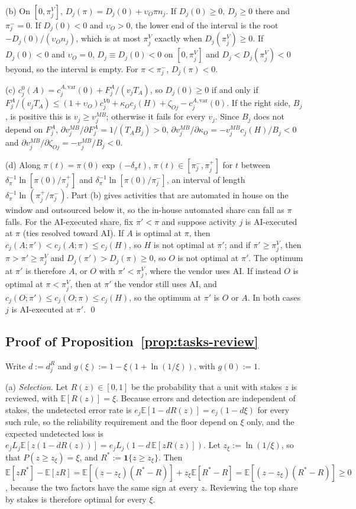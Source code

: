 (b) On $[0,\pi^V_j]$, $D_j(\pi)=D_j(0)+\upsilon_O\pi n_j$. If $D_j(0)\ge 0$, $D_j\ge 0$ there and $\pi^-_j=0$. If $D_j(0)<0$ and $\upsilon_O>0$, the lower end of the interval is the root $-D_j(0)/(\upsilon_On_j)$, which is at most $\pi^V_j$ exactly when $D_j(\pi^V_j)\ge 0$. If $D_j(0)<0$ and $\upsilon_O=0$, $D_j\equiv D_j(0)<0$ on $[0,\pi^V_j]$ and $D_j<D_j(\pi^V_j)<0$ beyond, so the interval is empty. For $\pi<\pi^-_j$, $D_j(\pi)<0$.

(c) $c^0_j(A)=c^{A,\mathrm{var}}_j(0)+F^A_j/(v_jT_A)$, so $D_j(0)\ge 0$ if and only if $F^A_j/(v_jT_A)\le(1+\upsilon_O)c^{V0}_j+\kappa_Oc_j(H)+\zeta_{Oj}-c^{A,\mathrm{var}}_j(0)$. If the right side, $B_j$, is positive this is $v_j\ge v^{MB}_j$; otherwise it fails for every $v_j$. Since $B_j$ does not depend on $F^A_j$, $\partial v^{MB}_j/\partial F^A_j=1/(T_AB_j)>0$, $\partial v^{MB}_j/\partial\kappa_O=-v^{MB}_jc_j(H)/B_j<0$ and $\partial v^{MB}_j/\partial\zeta_{Oj}=-v^{MB}_j/B_j<0$.

(d) Along $\pi(t)=\pi(0)\exp(-\delta_\pi t)$, $\pi(t)\in[\pi^-_j,\pi^+_j]$ for $t$ between $\delta_\pi^{-1}\ln[\pi(0)/\pi^+_j]$ and $\delta_\pi^{-1}\ln[\pi(0)/\pi^-_j]$, an interval of length $\delta_\pi^{-1}\ln(\pi^+_j/\pi^-_j)$. Part (b) gives activities that are automated in house on the window and outsourced below it, so the in-house automated share can fall as $\pi$ falls. For the AI-executed share, fix $\pi'<\pi$ and suppose activity $j$ is AI-executed at $\pi$ (ties resolved toward AI). If $A$ is optimal at $\pi$, then $c_j(A;\pi')<c_j(A;\pi)\le c_j(H)$, so $H$ is not optimal at $\pi'$; and if $\pi'\ge\pi^V_j$, then $\pi>\pi'\ge\pi^V_j$ and $D_j(\pi')>D_j(\pi)\ge 0$, so $O$ is not optimal at $\pi'$. The optimum at $\pi'$ is therefore $A$, or $O$ with $\pi'<\pi^V_j$, where the vendor uses AI. If instead $O$ is optimal at $\pi<\pi^V_j$, then at $\pi'$ the vendor still uses AI, and $c_j(O;\pi')\le c_j(O;\pi)\le c_j(H)$, so the optimum at $\pi'$ is $O$ or $A$. In both cases $j$ is AI-executed at $\pi'$. \qed

\subsection*{Proof of Proposition~\ref{prop:tasks-review}}

Write $d:=d^R_j$ and $g(\xi):=1-\xi(1+\ln(1/\xi))$, with $g(0):=1$.

(a) \emph{Selection.} Let $R(z)\in[0,1]$ be the probability that a unit with stakes $z$ is reviewed, with $\mathbb E[R(z)]=\xi$. Because errors and detection are independent of stakes, the undetected error rate is $e_j\mathbb E[1-dR(z)]=e_j(1-d\xi)$ for every such rule, so the reliability requirement and the floor depend on $\xi$ only, and the expected undetected loss is $e_jL_j\mathbb E[z(1-dR(z))]=e_jL_j(1-d\,\mathbb E[zR(z)])$. Let $z_\xi:=\ln(1/\xi)$, so that $P(z\ge z_\xi)=\xi$, and $R^*:=\mathbf 1\{z\ge z_\xi\}$. Then $\mathbb E[zR^*]-\mathbb E[zR]=\mathbb E[(z-z_\xi)(R^*-R)]+z_\xi\mathbb E[R^*-R]=\mathbb E[(z-z_\xi)(R^*-R)]\ge 0$, because the two factors have the same sign at every $z$. Reviewing the top share by stakes is therefore optimal for every $\xi$.

